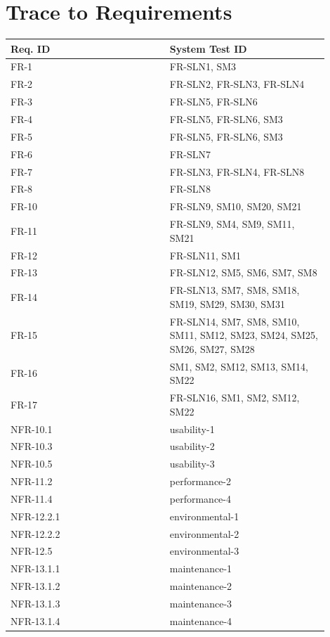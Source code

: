 \documentclass[12pt, titlepage]{article}
\begin{document}
\section{Trace to Requirements}
\begin{longtable}{|p{0.45\linewidth}|p{0.45\linewidth}|}
\hline
\textbf{Req. ID} & \textbf{System Test ID} \\
\hline
FR-1 & FR-SLN1, SM3 \\
\hline
FR-2 & FR-SLN2, FR-SLN3, FR-SLN4 \\
\hline
FR-3 & FR-SLN5, FR-SLN6 \\
\hline
FR-4 & FR-SLN5, FR-SLN6, SM3 \\
\hline
FR-5 & FR-SLN5, FR-SLN6, SM3 \\
\hline
FR-6 & FR-SLN7 \\
\hline
FR-7 & FR-SLN3, FR-SLN4, FR-SLN8 \\
\hline
FR-8 & FR-SLN8 \\
\hline
FR-10 & FR-SLN9, SM10, SM20, SM21 \\
\hline
FR-11 & FR-SLN9, SM4, SM9, SM11, SM21 \\
\hline
FR-12 & FR-SLN11, SM1 \\
\hline
FR-13 & FR-SLN12, SM5, SM6, SM7, SM8 \\
\hline
FR-14 & FR-SLN13, SM7, SM8, SM18, SM19, SM29, SM30, SM31 \\
\hline
FR-15 & FR-SLN14, SM7, SM8, SM10, SM11, SM12, SM23, SM24, SM25, SM26, SM27, SM28 \\
\hline
FR-16 & SM1, SM2, SM12, SM13, SM14, SM22 \\
\hline
FR-17 & FR-SLN16, SM1, SM2, SM12, SM22 \\
\hline
NFR-10.1 & usability-1 \\
\hline
NFR-10.3 & usability-2 \\
\hline
NFR-10.5 & usability-3 \\
\hline
NFR-11.2 & performance-2 \\
\hline
NFR-11.4 & performance-4 \\
\hline
NFR-12.2.1 & environmental-1 \\
\hline
NFR-12.2.2 & environmental-2 \\
\hline
NFR-12.5 & environmental-3 \\
\hline
NFR-13.1.1 & maintenance-1 \\
\hline
NFR-13.1.2 & maintenance-2 \\
\hline
NFR-13.1.3 & maintenance-3 \\
\hline
NFR-13.1.4 & maintenance-4 \\

\end{longtable}
\end{document}
